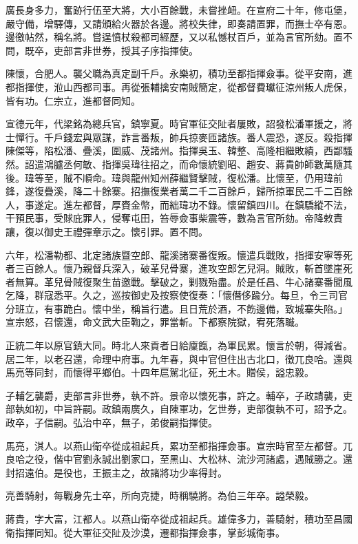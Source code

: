 \begin{pinyinscope}
廣長身多力，奮跡行伍至大將，大小百餘戰，未嘗挫衄。在宣府二十年，修屯堡，嚴守備，增驛傳，又請頒給火器於各邊。將校失律，即奏請置罪，而撫士卒有恩。邊徼帖然，稱名將。嘗逞憤杖殺都司經歷，又以私憾杖百戶，並為言官所劾。置不問，既卒，吏部言非世券，授其子序指揮使。

陳懷，合肥人。襲父職為真定副千戶。永樂初，積功至都指揮僉事。從平安南，進都指揮使，涖山西都司事。再從張輔擒安南賊簡定，從都督費瓛征涼州叛人虎保，皆有功。仁宗立，進都督同知。

宣德元年，代梁銘為總兵官，鎮寧夏。時官軍征交阯者屢敗，詔發松潘軍援之，將士憚行。千戶錢宏與眾謀，詐言番叛，帥兵掠麥匝諸族。番人震恐，遂反。殺指揮陳傑等，陷松潘、疊溪，圍威、茂諸州。指揮吳玉、韓整、高隆相繼敗績，西鄙騷然。詔遣鴻臚丞何敏、指揮吳瑋往招之，而命懷統劉昭、趙安、蔣貴帥師數萬隨其後。瑋等至，賊不順命。瑋與龍州知州薛繼賢擊賊，復松潘。比懷至，仍用瑋前鋒，遂復疊溪，降二十餘寨。招撫復業者萬二千二百餘戶，歸所掠軍民二千二百餘人，事遂定。進左都督，厚賚金幣，而絀瑋功不錄。懷留鎮四川。在鎮驕縱不法，干預民事，受賕庇罪人，侵奪屯田，笞辱僉事柴震等，數為言官所劾。帝降敕責讓，復以御史王禮彈章示之。懷引罪。置不問。

六年，松潘勒都、北定諸族暨空郎、龍溪諸寨番復叛。懷遣兵戰敗，指揮安寧等死者三百餘人。懷乃親督兵深入，破革兒骨寨，進攻空郎乞兒洞。賊敗，斬首墜崖死者無算。革兒骨賊復聚生苗邀戰。擊破之，剿戮殆盡。於是任昌、牛心諸寨番聞風乞降，群寇悉平。久之，巡按御史及按察使復奏：「懷僭侈踰分。每旦，令三司官分班立，有事跪白。懷中坐，稱旨行遣。且日荒於酒，不飭邊備，致城寨失陷。」宣宗怒，召懷還，命文武大臣鞫之，罪當斬。下都察院獄，宥死落職。

正統二年以原官鎮大同。時北人來貢者日給廩餼，為軍民累。懷言於朝，得減省。居二年，以老召還，命理中府事。九年春，與中官但住出古北口，徵兀良哈。還與馬亮等同封，而懷得平鄉伯。十四年扈駕北征，死土木。贈侯，謚忠毅。

子輔乞襲爵，吏部言非世券，執不許。景帝以懷死事，許之。輔卒，子政請襲，吏部執如初，中旨許嗣。政鎮兩廣久，自陳軍功，乞世券，吏部復執不可，詔予之。政卒，子信嗣。弘治中卒，無子，弟俊嗣指揮使。

馬亮，淇人。以燕山衛卒從成祖起兵，累功至都指揮僉事。宣宗時官至左都督。兀良哈之役，偕中官劉永誠出劉家口，至黑山、大松林、流沙河諸處，遇賊勝之。還封招遠伯。是役也，王振主之，故諸將功少率得封。

亮善騎射，每戰身先士卒，所向克捷，時稱驍將。為伯三年卒。謚榮毅。

蔣貴，字大富，江都人。以燕山衛卒從成祖起兵。雄偉多力，善騎射，積功至昌國衛指揮同知。從大軍征交阯及沙漠，遷都指揮僉事，掌彭城衛事。


\end{pinyinscope}
